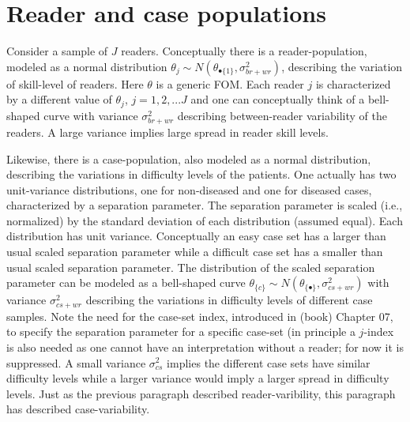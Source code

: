 \documentclass[
]{book}
\begin{document}
\hypertarget{DBMAnalysisBkgrnd-reader-case-populations}{%
\section{Reader and case populations}\label{DBMAnalysisBkgrnd-reader-case-populations}}

Consider a sample of \(J\) readers. Conceptually there is a reader-population, modeled as a normal distribution \(\theta_j \sim N\left ( \theta_{\bullet\{1\}}, \sigma_{br+wr}^{2} \right )\), describing the variation of skill-level of readers. Here \(\theta\) is a generic FOM. Each reader \(j\) is characterized by a different value of \(\theta_j\), \(j=1,2,...J\) and one can conceptually think of a bell-shaped curve with variance \(\sigma_{br+wr}^{2}\) describing between-reader variability of the readers. A large variance implies large spread in reader skill levels.

Likewise, there is a case-population, also modeled as a normal distribution, describing the variations in difficulty levels of the patients. One actually has two unit-variance distributions, one for non-diseased and one for diseased cases, characterized by a separation parameter. The separation parameter is scaled (i.e., normalized) by the standard deviation of each distribution (assumed equal). Each distribution has unit variance. Conceptually an easy case set has a larger than usual scaled separation parameter while a difficult case set has a smaller than usual scaled separation parameter. The distribution of the scaled separation parameter can be modeled as a bell-shaped curve \(\theta_{\{c\}} \sim N\left ( \theta_{\{\bullet\}}, \sigma_{cs+wr}^{2} \right )\) with variance \(\sigma_{cs+wr}^{2}\) describing the variations in difficulty levels of different case samples. Note the need for the case-set index, introduced in (book) Chapter 07, to specify the separation parameter for a specific case-set (in principle a \(j\)-index is also needed as one cannot have an interpretation without a reader; for now it is suppressed. A small variance \(\sigma_{cs}^{2}\) implies the different case sets have similar difficulty levels while a larger variance would imply a larger spread in difficulty levels. Just as the previous paragraph described reader-varibility, this paragraph has described case-variability.
\end{document}
